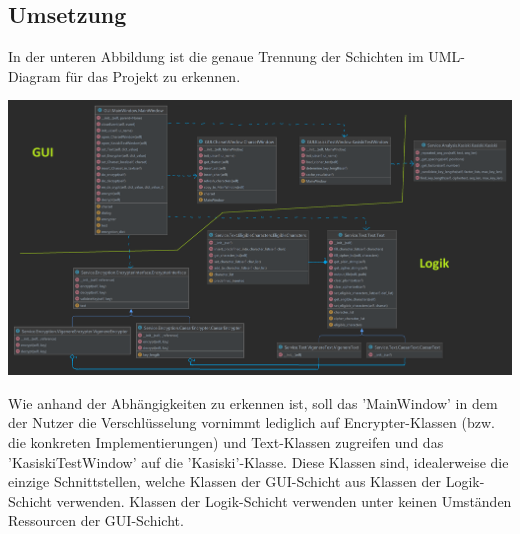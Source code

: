 \documentclass[12pt]{article}
\begin{document}
\subsection{Umsetzung}
In der unteren Abbildung ist die genaue Trennung der Schichten im UML-Diagram für das Projekt zu erkennen.
\begin{center}
	\includegraphics[width=15cm]{bilder/UML_Diagram_professionaly_edited_Schichten.png}
\end{center}
Wie anhand der Abhängigkeiten zu erkennen ist, soll das 'MainWindow' in dem der Nutzer die Verschlüsselung vornimmt lediglich auf Encrypter-Klassen (bzw. die konkreten Implementierungen) und Text-Klassen zugreifen und das 'KasiskiTestWindow' auf die 'Kasiski'-Klasse. Diese Klassen sind, idealerweise die einzige Schnittstellen, welche Klassen der GUI-Schicht aus Klassen der Logik-Schicht verwenden. Klassen der Logik-Schicht verwenden unter keinen Umständen Ressourcen der GUI-Schicht.

\newpage
\end{document}
